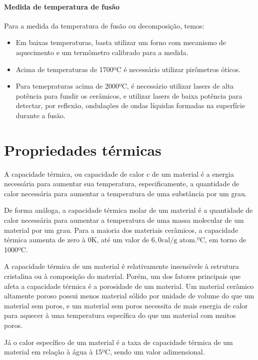 \paragraph*{Medida de temperatura de fusão} Para a medida da temperatura de fusão ou decomposição, temos:

\begin{itemize}
  \item Em baixas temperaturas, basta utilizar um forno com mecanismo de aquecimento e um termômetro calibrado para a medida.
  \item Acima de temperaturas de 1700ºC é necessário utilizar pirômetros óticos.
  \item Para temepraturas acima de 2000ºC, é necessário utilizar lasers de alta potência para fundir os cerâmicos, e utilizar lasers de baixa potência para detectar, por reflexão, ondulações de ondas líquidas formadas na superfície durante a fusão.
\end{itemize}

\section*{Propriedades térmicas}

\begin{definition}
  A capacidade térmica, ou capacidade de calor $c$ de um material é a energia necessária para aumentar sua temperatura, especificamente, a quantidade de calor necessária para aumentar a temperatura de uma substância por um grau.
\end{definition}

De forma análoga, a capacidade térmica molar de um material é a quantidade de calor necessária para aumentar a temperatura de uma massa molecular de um material por um grau. Para a maioria dos materiais cerâmicos, a capacidade térmica aumenta de zero à 0K, até um valor de $6,0 \text{cal/g atom.ºC}$, em torno de 1000ºC.

A capacidade térmica de um material é relativamente insensívele à estrutura cristalina ou à composição do material. Porém, um dos fatores principais que afeta a capacidade térmica é a porosidade de um material. Um material cerâmico altamente poroso possui menos material sólido por unidade de volume do que um material sem poros, e um material sem poros necessita de mais energia de calor para aquecer à uma temperatura específica do que um material com muitos poros.

Já o calor específico de um material é a taxa de capacidade térmica de um material em relação à água à 15ºC, sendo um valor adimensional.

